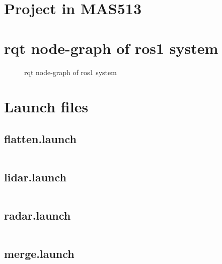 \appendix

\chapter{Project in MAS513}
\label{Appdix:MAS513}
 

\chapter{rqt node-graph of ros1 system}
\label{Appdix:rqtROS1NB}
\newpage
\begin{figure}[H]

  \caption{rqt node-graph of ros1 system}
  \label{fig:Appdix:rqt:ros1_noBridge}
\end{figure}

\chapter{Launch files}

\section{flatten.launch}
\label{Appdix:flatten.launch}
\inputminted{xml}{ros_system/launch/src/sublaunch/flatten.launch}

\section{lidar.launch}
\label{Appdix:lidar.launch}
\inputminted{xml}{ros_system/launch/src/sublaunch/lidar.launch}

\section{radar.launch}
\label{Appdix:radar.launch}
\inputminted{xml}{ros_system/launch/src/sublaunch/radar.launch}

\section{merge.launch}
\label{Appdix:merge.launch}
\inputminted{xml}{ros_system/launch/src/sublaunch/merge.launch}